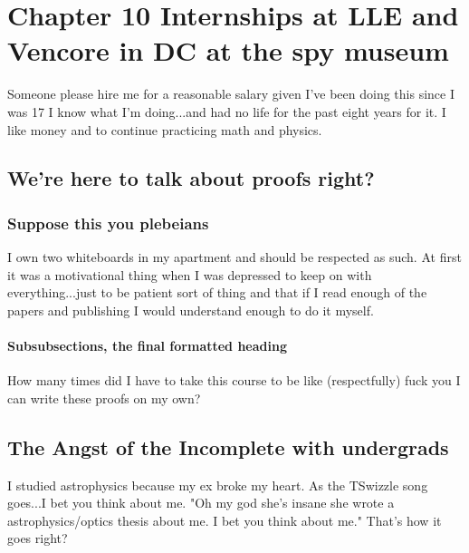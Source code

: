 \chapter{Chapter 10 Internships at LLE and Vencore in DC at the spy museum}

Someone please hire me for a reasonable salary given I've been doing this since I was 17 I know what I'm doing...and had no life for the past eight years for it. I like money and to continue practicing math and physics. 

\section[Shorter Title]{We're here to talk about proofs right?}



\subsection{Suppose this you plebeians}

I own two whiteboards in my apartment and should be respected as such. At first it was a motivational thing when I was depressed to keep on with everything...just to be patient sort of thing and that if I read enough of the papers and publishing I would understand enough to do it myself. 

\subsubsection{Subsubsections, the final formatted heading}

How many times did I have to take this course to be like (respectfully) fuck you I can write these proofs on my own?

\section{The Angst of the Incomplete with undergrads}

I studied astrophysics because my ex broke my heart. As the TSwizzle song goes...I bet you think about me. "Oh my god she's insane she wrote a astrophysics/optics thesis about me. I bet you think about me." That's how it goes right?